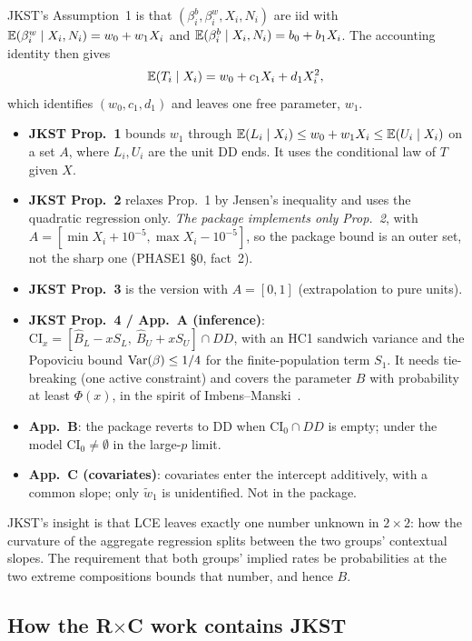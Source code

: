 JKST's Assumption~1 is that $(\beta^b_i,\beta^w_i,X_i,N_i)$ are iid with
$\mathbb E(\beta^w_i\mid X_i,N_i)=w_0+w_1X_i$ and
$\mathbb E(\beta^b_i\mid X_i,N_i)=b_0+b_1X_i$. The accounting identity then gives
\[
\mathbb E(T_i\mid X_i)=w_0+c_1X_i+d_1X_i^2 ,
\]
which identifies $(w_0,c_1,d_1)$ and leaves one free parameter, $w_1$.
\begin{itemize}[nosep]
\item \textbf{JKST Prop.~1} bounds $w_1$ through
$\mathbb E(L_i\mid X_i)\le w_0+w_1X_i\le \mathbb E(U_i\mid X_i)$ on a set $A$, where $L_i,U_i$
are the unit DD ends. It uses the conditional law of $T$ given $X$.
\item \textbf{JKST Prop.~2} relaxes Prop.~1 by Jensen's inequality and uses the
quadratic regression only. \emph{The package implements only Prop.~2}, with
$A=[\min X_i+10^{-5},\max X_i-10^{-5}]$, so the package bound is an outer set,
not the sharp one (PHASE1 \S0, fact~2).
\item \textbf{JKST Prop.~3} is the version with $A=[0,1]$ (extrapolation to pure
units).
\item \textbf{JKST Prop.~4 / App.~A (inference)}:
$\mathrm{CI}_x=[\hat B_L-xS_L,\ \hat B_U+xS_U]\cap DD$, with an HC1 sandwich
variance and the Popoviciu bound $\operatorname{Var}(\beta)\le1/4$ for the finite-population
term $S_1$. It needs tie-breaking (one active constraint) and covers the
parameter $B$ with probability at least $\Phi(x)$, in the spirit of
Imbens--Manski~\citep{imbensmanski2004}.
\item \textbf{App.~B}: the package reverts to DD when $\mathrm{CI}_0\cap DD$ is
empty; under the model $\mathrm{CI}_0\ne\emptyset$ in the large-$p$ limit.
\item \textbf{App.~C (covariates)}: covariates enter the intercept additively,
with a common slope; only $\tilde w_1$ is unidentified. Not in the package.
\end{itemize}

\begin{plain}
JKST's insight is that LCE leaves exactly one number unknown in $2\times2$: how
the curvature of the aggregate regression splits between the two groups'
contextual slopes. The requirement that both groups' implied rates be
probabilities at the two extreme compositions bounds that number, and hence $B$.
\end{plain}

\subsection{How the R$\times$C work contains JKST}

